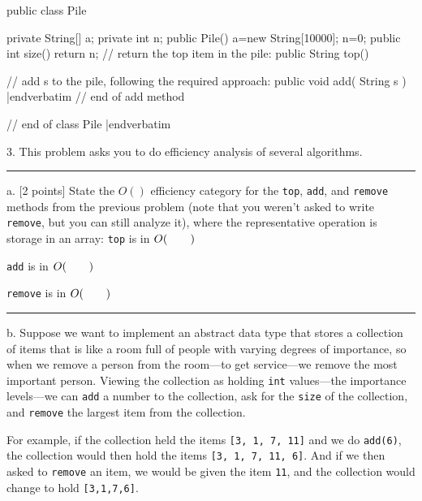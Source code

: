 {\baselineskip
\verbatim
public class Pile
{
  private String[] a;        private int n;
  public Pile(){ a=new String[10000];  n=0; }
  public int size(){ return n;}
  // return the top item in the pile:
  public String top()
  {
  
  
  
  
  }
  // add s to the pile, following the required approach:
  public void add( String s )
  {
|endverbatim
\verbatim
  }// end of add method
}// end of class Pile
|endverbatim
\par}
                
\vfil

\newtestpage{\courselabel}{\testlabel}{}
\item{3.}  %
This problem asks you to do efficiency analysis of several algorithms.
\smallskip\hrule\medskip

\item{a.} [2 points]  State the $O()$ efficiency category for the {\tt top}, {\tt add}, and
{\tt remove} methods from the previous problem (note that you weren't asked to write
{\tt remove}, but you can still analyze it), where the representative operation is storage
in an array:
\medskip
{\tt top} is in $O( \hbox{\quad\quad})$
\bigskip

{\tt add} is in $O(   \hbox{\quad\quad}  )$
\bigskip

{\tt remove} is in $O(  \hbox{\quad\quad} )$
\bigskip\hrule\medskip

\item{b.}  Suppose we want to implement an abstract data type that stores a
collection of items that is like a room full of people with varying degrees of importance,
so when we remove a person from the room---to get service---we remove the
most important person.
\medskip
Viewing the collection as holding {\tt int} values---the importance levels---we can {\tt add} a
number to the collection, ask for the {\tt size} of the collection, and {\tt remove} the
largest item from the collection.
\medskip

For example, if the collection held the items {\tt [3, 1, 7, 11]} and we do {\tt add(6)}, the
collection would then hold the items {\tt [3, 1, 7, 11, 6]}.  And if we then asked to {\tt remove}
an item, we would be given the item {\tt 11}, and the collection would change to hold
{\tt [3,1,7,6]}.
\medskip

